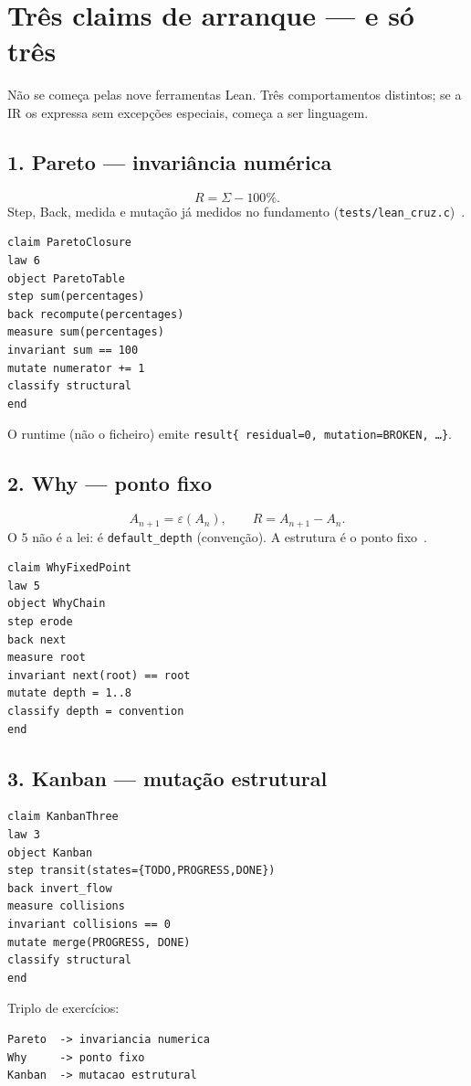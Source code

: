 \documentclass[11pt,a4paper]{article}
\newcommand{\code}[1]{\texttt{\small #1}}
\begin{document}
\section{Três claims de arranque --- e só três}\label{sec:tres}

Não se começa pelas nove ferramentas Lean. Três comportamentos distintos;
se a IR os expressa sem excepções especiais, começa a ser linguagem.

\subsection*{1. Pareto --- invariância numérica}
\[
R=\Sigma-100\%.
\]
Step, Back, medida e mutação já medidos no fundamento
(\code{tests/lean\_cruz.c})~\cite{fundamento}.

\begin{verbatim}
claim ParetoClosure
law 6
object ParetoTable
step sum(percentages)
back recompute(percentages)
measure sum(percentages)
invariant sum == 100
mutate numerator += 1
classify structural
end
\end{verbatim}
O runtime (não o ficheiro) emite \code{result\{ residual=0, mutation=BROKEN, \ldots\}}.

\subsection*{2. Why --- ponto fixo}
\[
A_{n+1}=\varepsilon(A_n),\qquad R=A_{n+1}-A_n.
\]
O $5$ não é a lei: é \code{default\_depth} (convenção). A estrutura é o
ponto fixo~\cite{fundamento}.

\begin{verbatim}
claim WhyFixedPoint
law 5
object WhyChain
step erode
back next
measure root
invariant next(root) == root
mutate depth = 1..8
classify depth = convention
end
\end{verbatim}

\subsection*{3. Kanban --- mutação estrutural}
\begin{verbatim}
claim KanbanThree
law 3
object Kanban
step transit(states={TODO,PROGRESS,DONE})
back invert_flow
measure collisions
invariant collisions == 0
mutate merge(PROGRESS, DONE)
classify structural
end
\end{verbatim}

\noindent Triplo de exercícios:
\begin{verbatim}
Pareto  -> invariancia numerica
Why     -> ponto fixo
Kanban  -> mutacao estrutural
\end{verbatim}
\end{document}
